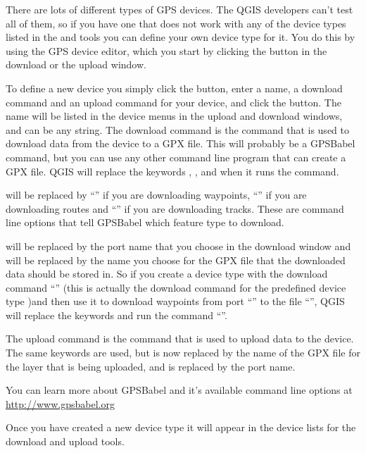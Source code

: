 There are lots of different types of GPS devices.
The QGIS developers can't test all of them, so if you have one that does not work with any of the device types listed in the  and  tools you can define your own device type for it.
You do this by using the GPS device editor, which you start by clicking the  button in the download or the upload window.

To define a new device you simply click the  button, enter a name, a download command and an upload command for your device, and click the  button.
The name will be listed in the device menus in the upload and download windows, and can be any string.
The download command is the command that is used to download data from the device to a GPX file.
This will probably be a GPSBabel command, but you can use any other command line program that can create a GPX file.
QGIS will replace the keywords , , and  when it runs the command.

 will be replaced by {}``'' if you are downloading waypoints, {}``'' if you are downloading routes and {}``'' if you are downloading tracks.
These are command line options that tell GPSBabel which feature type to download.

 will be replaced by the port name that you choose in the download window and  will be replaced by the name you choose for the GPX file that the downloaded data should be stored in.
So if you create a device type with the download command {}``'' (this is actually the download command for the predefined device type )and then use it to download waypoints from port {}``'' to the file {}``'', QGIS will replace the keywords and run the command {}``''.

The upload command is the command that is used to upload data to the device.
The same keywords are used, but  is now replaced by the name of the GPX file for the layer that is being uploaded, and  is replaced by the port name.

You can learn more about GPSBabel and it's available command line options at \url{http://www.gpsbabel.org}

Once you have created a new device type it will appear in the device lists for the download and upload tools.